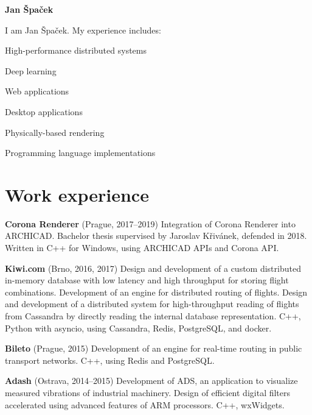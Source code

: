 \documentclass[11pt,a4paper]{article}
\begin{document}
\thispagestyle{empty}
\sffamily

{\bfseries\huge Jan Špaček}

\begin{multicols}{2}

I am Jan Špaček. My experience includes:
\begin{compactitem}
  \item High-performance distributed systems
  \item Deep learning
  \item Web applications
  \item Desktop applications
  \item Physically-based rendering
  \item Programming language implementations
\end{compactitem}

\section*{Work experience}

\textbf{Corona Renderer} (Prague, 2017–2019)
  \newline Integration of Corona Renderer into ARCHICAD.
  \newline Bachelor thesis supervised by Jaroslav Křivánek, defended in 2018.
  \newline Written in C++ for Windows, using ARCHICAD APIs and Corona API.

\textbf{Kiwi.com} (Brno, 2016, 2017)
  \newline Design and development of a custom distributed in-memory database
  with low latency and high throughput for storing flight combinations.
  \newline Development of an engine for distributed routing of flights.
  \newline Design and development of a distributed system for high-throughput
  reading of flights from Cassandra by directly reading the internal database
  representation.
  \newline C++, Python with asyncio, using Cassandra, Redis, PostgreSQL, and
  docker.

\textbf{Bileto} (Prague, 2015)
  \newline Development of an engine for real-time routing in public transport
    networks.
  \newline C++, using Redis and PostgreSQL.

\textbf{Adash} (Ostrava, 2014–2015)
  \newline Development of ADS, an application to visualize measured vibrations
  of industrial machinery.
  \newline Design of efficient digital filters accelerated using advanced
  features of ARM processors.
  \newline C++, wxWidgets.



\end{multicols}
\end{document}
